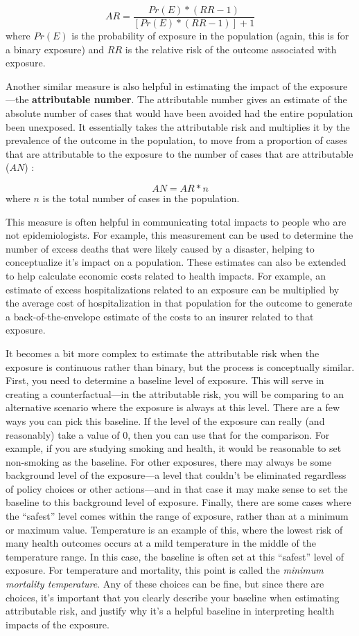 \documentclass[
]{book}
\begin{document}
\[
AR = \frac{Pr(E) * (RR-1)}{[Pr(E) * (RR-1)] + 1}
\]
where \(Pr(E)\) is the probability of exposure in the population (again, this is for a binary exposure) and \(RR\) is the relative risk of the outcome associated with exposure.

Another similar measure is also helpful in estimating the impact of the exposure---the \textbf{attributable number}. The attributable number gives an estimate of the absolute number of cases that would have been avoided had the entire population been unexposed. It essentially takes the attributable risk and multiplies it by the prevalence of the outcome in the population, to move from a proportion of cases that are attributable to the exposure to the number of cases that are attributable (\(AN\)) \citep{benichou2006attributable, northridge1995public}:

\[
AN = AR * n
\]
where \(n\) is the total number of cases in the population.

This measure is often helpful in communicating total impacts to people who are not epidemiologists. For example, this measurement can be used to determine the number of excess deaths that were likely caused by a disaster, helping to conceptualize it's impact on a population. These estimates can also be extended to help calculate economic costs related to health impacts. For example, an estimate of excess hospitalizations related to an exposure can be multiplied by the average cost of hospitalization in that population for the outcome to generate a back-of-the-envelope estimate of the costs to an insurer related to that exposure.

It becomes a bit more complex to estimate the attributable risk when the exposure is continuous rather than binary, but the process is conceptually similar. First, you need to determine a baseline level of exposure. This will serve in creating a counterfactual---in the attributable risk, you will be comparing to an alternative scenario where the exposure is always at this level. There are a few ways you can pick this baseline. If the level of the exposure can really (and reasonably) take a value of 0, then you can use that for the comparison. For example, if you are studying smoking and health, it would be reasonable to set non-smoking as the baseline. For other exposures, there may always be some background level of the exposure---a level that couldn't be eliminated regardless of policy choices or other actions---and in that case it may make sense to set the baseline to this background level of exposure. Finally, there are some cases where the ``safest'' level comes within the range of exposure, rather than at a minimum or maximum value. Temperature is an example of this, where the lowest risk of many health outcomes occurs at a mild temperature in the middle of the temperature range. In this case, the baseline is often set at this ``safest'' level of exposure. For temperature and mortality, this point is called the \emph{minimum mortality temperature}. Any of these choices can be fine, but since there are choices, it's important that you clearly describe your baseline when estimating attributable risk, and justify why it's a helpful baseline in interpreting health impacts of the exposure.
\end{document}
